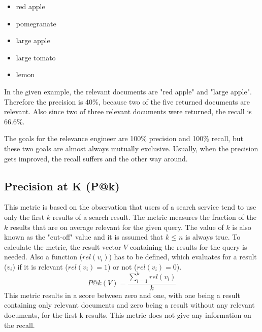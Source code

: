 \begin{itemize}
	\item red apple
	\item pomegranate
	\item large apple
	\item large tomato
	\item lemon
\end{itemize}
In the given example, the relevant documents are "red apple" and "large apple".
Therefore the precision is 40\%, because two of the five returned documents are relevant.
Also since two of three relevant documents were returned, the recall is 66.6\%.
\par
The goals for the relevance engineer are 100\% precision and 100\% recall, but these two goals are almost always mutually exclusive.
Usually, when the precision gets improved, the recall suffers and the other way around\cite[P. 77-78]{relevant_search_2016}.

\subsection{Precision at K (P@k)}
\label{ref:qa:offlinemetrics:patk}
This metric is based on the observation that users of a search service 
tend to use only the first $k$ results of a search result.
The metric measures the fraction of the $k$ results that are on average relevant for the given query.\cite[P. 416]{mcsherry_najork_2008}
The value of $k$ is also known as the "cut-off" value and it is assumed that $k\leq n$ is always true.
To calculate the metric, the result vector $V$ containing the results for the query is needed.
Also a function ($rel(v_i)$) has to be defined, which evaluates for a result ($v_i$) if it is relevant ($rel(v_i)=1$) or not ($rel(v_i)=0$).
\begin{equation}
	P@k(V) = \frac{\sum_{i=1}^{k} rel(v_i)}{k}
\end{equation}
This metric results in a score between zero and one, with one being a result containing only relevant documents 
and zero being a result without any relevant documents, for the first k results.
This metric does not give any information on the recall.

